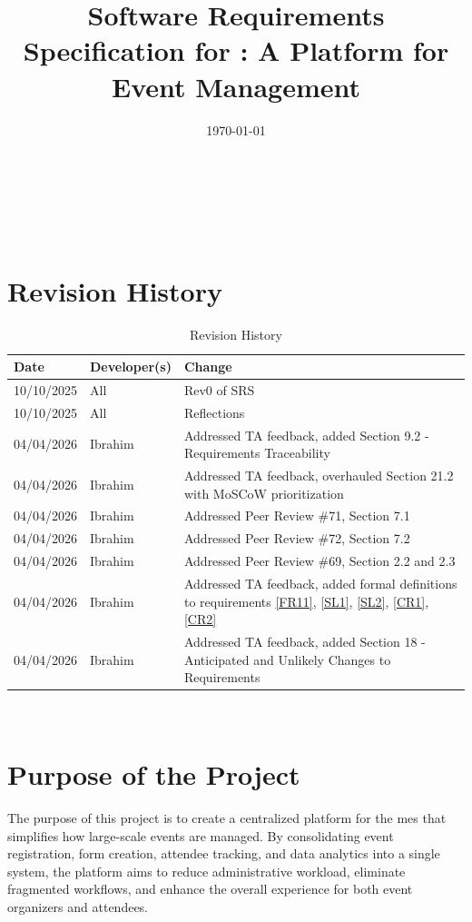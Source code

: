 \documentclass[12pt]{article}
\begin{document}
\title{Software Requirements Specification for \progname: A Platform for Event Management }
\author{\authname}
\date{\today}
	
\maketitle
~\newpage

\tableofcontents

~\newpage

\section*{Revision History}
\begin{table}[hp]
\begin{tabularx}{\textwidth}{llX}
\toprule
\textbf{Date} & \textbf{Developer(s)} & \textbf{Change}\\
\midrule
10/10/2025 & All & Rev0 of SRS\\
10/10/2025 & All & Reflections \\
04/04/2026 & Ibrahim & Addressed TA feedback, added Section 9.2 - Requirements Traceability \\
04/04/2026 & Ibrahim & Addressed TA feedback, overhauled Section 21.2 with MoSCoW prioritization \\
04/04/2026 & Ibrahim & Addressed Peer Review \#71, Section 7.1 \\
04/04/2026 & Ibrahim & Addressed Peer Review \#72, Section 7.2 \\
04/04/2026 & Ibrahim & Addressed Peer Review \#69, Section 2.2 and 2.3 \\
04/04/2026 & Ibrahim & Addressed TA feedback, added formal definitions to requirements \ref{FR11}, \ref{SL1}, \ref{SL2}, \ref{CR1}, \ref{CR2} \\
04/04/2026 & Ibrahim & Addressed TA feedback, added Section 18 - Anticipated and Unlikely Changes to Requirements\\
\bottomrule
\end{tabularx}
\caption{Revision History} \label{TblRevisionHistory}
\end{table}


~\newpage
\section{Purpose of the Project}

The purpose of this project is to create a centralized platform for the \gls{mes} that simplifies how large-scale events
are managed. By consolidating event registration, form creation, attendee tracking, and data analytics into a single
system, the platform aims to reduce administrative workload, eliminate fragmented workflows, and enhance the overall
experience for both event organizers and attendees.
\end{document}
